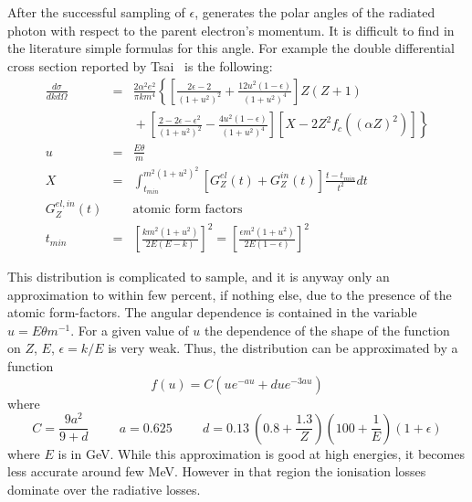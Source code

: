 After the successful sampling of $\epsilon$,  generates the
polar angles of the radiated photon with respect to the parent
electron's momentum. It is difficult to find in the literature
simple formulas for this angle. For example the double differential
cross section reported by Tsai~\cite{bib-TSAI,bib-TSAI-err} is the 
following:
\begin{eqnarray*}
\frac{d \sigma}{dkd \Omega} 
& = & \frac{2 \alpha^{2}e^{2}}{\pi k m^{4}}
  \left\{ \left[ \frac{2\epsilon-2}{(1+u^2)^2}+
\frac{12u^2(1-\epsilon)}{(1+u^2)^4}\right]
      Z(Z+1)  \right. \\
&   & \mbox{} + \left. \left[ \frac{2-2\epsilon-\epsilon^{2}}{(1+u^2)^2}- 
      \frac{4u^2(1-\epsilon)}{(1+u^2)^4}
      \right]
      \left[ X-2Z^{2}f_{c}((\alpha Z)^{2})\right]
      \right\} \\
u & = & \frac{E \theta}{m} \\
X & = & \int_{t_{min}}^{m^{2}(1+u^{2})^{2}}
{\left [ G_{Z}^{el}(t) + G_{Z}^{in}(t) \right ] \frac{t-t_{min}}
{t^{2}} dt} \\
G_{Z}^{el, in}(t) & & \mbox{atomic form factors} \\
t_{min} & = & \left [ \frac{k m^{2} (1+u^{2})}{2 E (E-k)} \right ] ^{2}
 = \left [ \frac{\epsilon m^{2} (1+u^{2})}{2 E (1-\epsilon)} \right ] ^{2}
\end{eqnarray*}

This distribution is complicated to sample, and it is anyway only an
approximation to within few percent, if nothing else, due to
the presence of the atomic form-factors. 
The angular dependence is contained in the
variable $u = E \theta m^{-1}$. For a given value
of $u$ the dependence of the shape of the function on $Z$, $E$,
$\epsilon = k/E$ is very weak.
Thus, the distribution can be approximated by a function
\begin{equation}
f(u) = C \left( u e^{-au} + d u e^{-3au} \right)
\end{equation}
where
\[
C = \frac{9a^{2}}{9 + d} \hspace{1cm} a = 0.625 \hspace{1cm} 
d = 0.13 \: \left ( 0.8+\frac{1.3}{Z} \right ) \left (100+\frac{1}{E} \right )
(1+\epsilon)
\]
where $E$ is in GeV. While this approximation is good at high energies,
it becomes less accurate around few MeV. However in that region the
ionisation losses dominate over the radiative losses.

